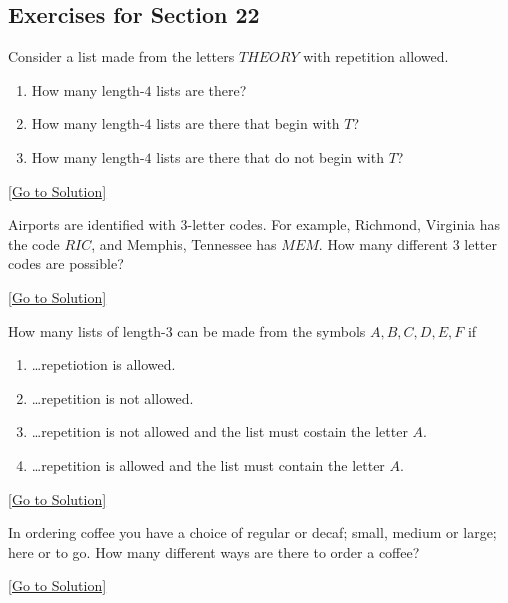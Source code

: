 \subsection{Exercises for Section 22}

\begin{exercise}\label{ex:2.22.1}
    Consider a list made from the letters $THEORY$ with repetition allowed. 
    \begin{enumerate}
        \item How many length-$4$ lists are there? 
        \item How many length-$4$ lists are there that begin with $T$? 
        \item How many length-$4$ lists are there that do not begin with $T$? 
    \end{enumerate}
\end{exercise}\hyperref[sol:2.22.1]{[Go to Solution]}

\begin{exercise}\label{ex:2.22.2}
    Airports are identified with $3$-letter codes. For example, Richmond, Virginia has the code $RIC$, and Memphis, Tennessee has $MEM$. How many different $3$ letter codes are possible? 
\end{exercise}\hyperref[sol:2.22.2]{[Go to Solution]}

\begin{exercise}\label{ex:2.22.3}
    How many lists of length-$3$ can be made from the symbols $A,B,C,D,E,F$ if
    \begin{enumerate}
        \item \ldots repetiotion is allowed. 
        \item \ldots repetition is not allowed. 
        \item \ldots repetition is not allowed and the list must costain the letter $A$. 
        \item \ldots repetition is allowed and the list must contain the letter $A$.  
    \end{enumerate}
\end{exercise}\hyperref[sol:2.22.3]{[Go to Solution]}

\begin{exercise}\label{ex:2.22.4}
    In ordering coffee you have a choice of regular or decaf; small, medium or large; here or to go. How many different ways are there to order a coffee? 
\end{exercise}\hyperref[sol:2.22.4]{[Go to Solution]}

